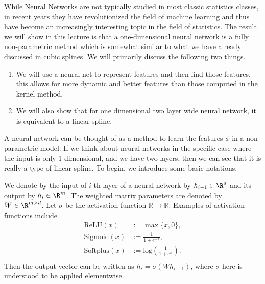 While Neural Networks are not typically studied in most classic statistics classes, in recent years they have revolutionized the field of machine learning and thus have become an increasingly interesting topic in the field of statistics.  The result we will show in this lecture is that a one-dimensional neural network is a fully non-parametric method which is somewhat similar to what we have already discussed in cubic splines. We will primarily discuss the following two things.
\begin{enumerate}
\item We will use a neural net to represent features and then find those features, this allows for more dynamic and better features than those computed in the kernel method.
\item We will also show that for one dimensional two layer wide neural network, it is equivalent to a linear spline.
\end{enumerate}
A neural network can be thought of as a method to learn the features $\phi$ in a non-parametric model. If we think about neural networks in the specific case where the input is only 1-dimensional, and we have two layers, then we can see that it is really a type of linear spline. To begin, we introduce some basic notations.
\begin{definition}
	We denote by the input of $i$-th layer of a neural network by $h_{i-1} \in \R^d$ and its output by $h_i \in \R^m$. The weighted matrix parameters are denoted by $W \in \R^{m \times d}$. Let $\sigma$ be the activation function $\mathbb{R} \to \mathbb{R}$. Examples of activation functions include
	\begin{align*}
		\text{ReLU}(x) &:= \max\{x, 0\}, \\
		\text{Sigmoid}(x) &:= \frac{1}{1+e^{-x}}, \\
		 \text{Softplus}(x) &:= \text{log} \left( \frac{1}{1+e^x} \right). \\
	\end{align*}
Then the output vector can be written as $h_i = \sigma(Wh_{i-1})$, where $\sigma$ here is understood to be applied elementwise.
\end{definition}

